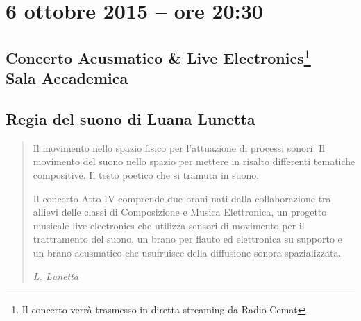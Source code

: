 \documentclass[8pt, twoside, a5paper]{extreport}
\begin{document}
\bigskip

\begin{multicols}{2}




\end{multicols}

\clearpage

\section*{6 ottobre 2015 -- ore 20:30}

\subsection*{{\small Concerto Acusmatico \& Live Electronics\footnote{ Il concerto verrà trasmesso in diretta streaming da Radio Cemat}} \\
	\textsf{Sala Accademica}}

{\fontsize{30}{30} }

\subsection*{\textsf{Regia del suono di Luana Lunetta}}

\begin{quote}
{\svolk \small
Il movimento nello spazio fisico per l'attuazione di processi sonori.
Il movimento del suono nello spazio per mettere in risalto differenti tematiche compositive.
Il testo poetico che si tramuta in suono.

Il concerto Atto IV comprende due brani nati dalla collaborazione tra allievi delle classi di Composizione e Musica Elettronica, un progetto musicale live-electronics che utilizza sensori di movimento per il trattramento del suono, un brano per flauto ed elettronica su supporto e un brano acusmatico che usufruisce della diffusione sonora spazializzata.}

\emph{L. Lunetta}
\end{quote}    


\begin{multicols}{2}




\end{multicols}

\clearpage
\end{document}
